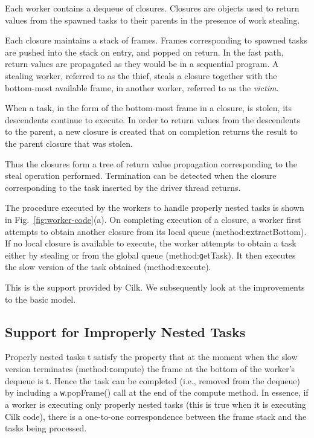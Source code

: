 Each worker contains a dequeue of closures. Closures are objects used
to return values from the spawned tasks to their parents in the
presence of work stealing.  

Each closure maintains a stack of frames. Frames corresponding to
spawned tasks are pushed into the stack on entry, and popped on
return. In the fast path, return values are propagated as they would
be in a sequential program. A stealing worker, referred to as the
{thief}, steals a closure together with the bottom-most available
frame, in another worker, referred to as the {\em victim}.

When a task, in the form of the bottom-most frame in a closure, is
stolen, its descendents continue to execute. In order to return values
from the descendents to the parent, a new closure is created that on
completion returns the result to the parent closure that was stolen. 

Thus the closures form a tree of return value propagation
corresponding to the steal operation performed. Termination can be
detected when the closure corresponding to the task inserted by the
driver thread returns. 

The procedure executed by the workers to handle properly nested tasks
is shown in Fig.~\ref{fig:worker-code}(a). On completing execution of
a closure, a worker first attempts to obtain another closure from its
local queue (method:{\texttt extractBottom}). If no local closure is
available to execute, the worker attempts to obtain a task either by
stealing or from the global queue (method:{\texttt getTask}). It then
executes the slow version of the task obtained (method:{\texttt
  execute}). 

This is the support provided by Cilk. We subsequently look at the
improvements to the basic model.


\subsection{Support for Improperly Nested Tasks}

Properly nested tasks t satisfy the property that at the moment when
the slow version terminates (method:{\texttt compute}) the frame at
the bottom of the worker's dequeue is t. Hence the task can be
completed (i.e., removed from the dequeue) by including a {\texttt
w.popFrame()} call at the end of the compute method. In essence, if a
worker is executing only properly nested tasks (this is true when it
is executing Cilk code), there is a one-to-one correspondence between
the frame stack and the tasks being processed.

